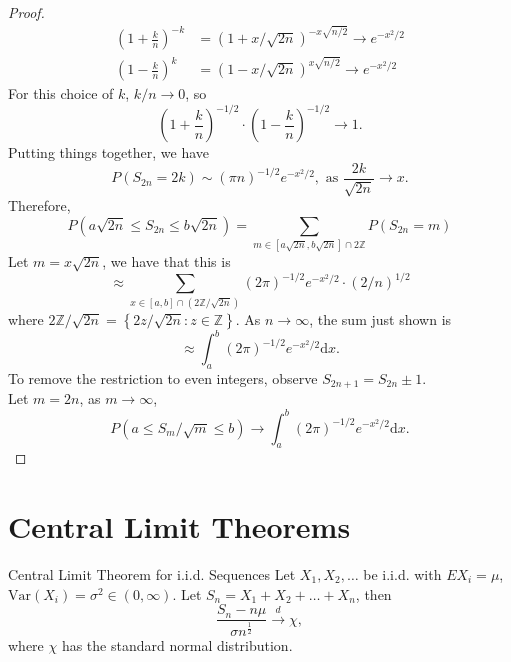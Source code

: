 \begin{proof}
\begin{equation*}
\begin{aligned}
        \left(1+\frac{k}{n}\right)^{-k} &=(1+x / \sqrt{2 n})^{-x \sqrt{n / 2}} \rightarrow e^{-x^{2} / 2} \\
        \left(1-\frac{k}{n}\right)^{k} &=(1-x / \sqrt{2 n})^{x \sqrt{n / 2}} \rightarrow e^{-x^{2} / 2}
        \end{aligned}
    \end{equation*}
    For this choice of $k$, $k/n \rightarrow 0$, so
    \begin{equation*}
        \left(1+\frac{k}{n}\right)^{-1 / 2} \cdot\left(1-\frac{k}{n}\right)^{-1 / 2} \rightarrow 1.
    \end{equation*}
    Putting things together, we have
    \begin{equation*}
        P\left(S_{2 n}=2 k\right) \sim (\pi n)^{-1 / 2} e^{-x^{2} / 2}, \text{ as } \frac{2k}{\sqrt{2n}} \rightarrow x.
    \end{equation*}
    Therefore,
    \begin{equation*}
        P\left( a\sqrt{2n} \leq S_{2 n} \leq b\sqrt{2 n} \right) = \sum_{m \in \left[a\sqrt{2 n},b\sqrt{2 n}\right] \cap 2\mathbb{Z}} P\left(S_{2 n}=m\right)
    \end{equation*}
    Let $m=x\sqrt{2 n}$, we have that this is
    \begin{equation*}
        \approx \sum_{x \in \left[a,b\right] \cap \left(2\mathbb{Z} / \sqrt{2 n}\right)}(2 \pi)^{-1 / 2} e^{-x^{2} / 2}\cdot(2/n)^{1/2}
    \end{equation*}
    where $2\mathbb{Z} / \sqrt{2 n} = \left\{2z/\sqrt{2n} : z\in\mathbb{Z}\right\}$. As $n\rightarrow\infty$, the sum just shown is
    \begin{equation*}
        \approx \int_{a}^{b}(2 \pi)^{-1 / 2} e^{-x^{2} / 2} \mathrm{d} x.
    \end{equation*}
    To remove the restriction to even integers, observe $S_{2 n +1}=S_{2 n} \pm 1$.\\
    Let $m=2n$, as $m\rightarrow\infty$,
    \begin{equation*}
        P\left(a \leq S_{m} / \sqrt{m} \leq b\right) \rightarrow \int_{a}^{b}(2 \pi)^{-1 / 2} e^{-x^{2} / 2} \mathrm{d} x.
    \end{equation*}
\end{proof}

\section{Central Limit Theorems}

\begin{theorem}{Central Limit Theorem for i.i.d. Sequences}{}
    Let $X_1,X_2,\ldots$ be i.i.d. with $EX_i=\mu$, $\text{Var}(X_i)=\sigma^2\in(0,\infty)$. Let $S_n=X_1+X_2+\ldots+X_n$, then
    \begin{equation}
        \frac{S_n-n\mu}{\sigma n^{\frac{1}{2}}} \stackrel{d}{\rightarrow} \chi,
    \end{equation}
    where $\chi$ has the standard normal distribution.
\end{theorem}

